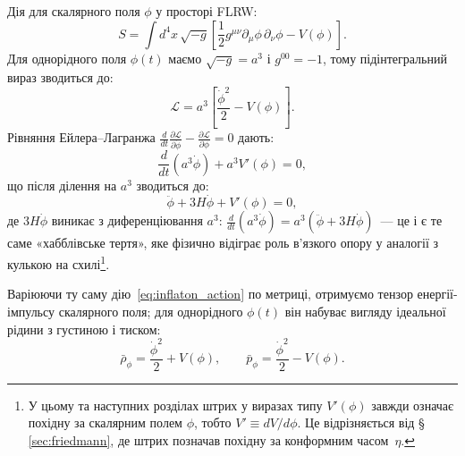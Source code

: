 \documentclass[12pt, a4paper]{article}
\begin{document}
Дія для скалярного поля $\phi$ у просторі FLRW:
\begin{equation}\label{eq:inflaton_action}
  S = \int d^4x\,\sqrt{-g}\left[\frac{1}{2}g^{\mu\nu}\partial_\mu\phi\,\partial_\nu\phi - V(\phi)\right].
\end{equation}
Для однорідного поля $\phi(t)$ маємо $\sqrt{-g} = a^3$ і $g^{00} = -1$,
тому підінтегральний вираз зводиться до:
\begin{equation*}
  \mathcal{L} = a^3\!\left[\frac{\dot{\phi}^2}{2} - V(\phi)\right].
\end{equation*}
Рівняння Ейлера--Лагранжа $\frac{d}{dt}\frac{\partial\mathcal{L}}{\partial\dot{\phi}} - \frac{\partial\mathcal{L}}{\partial\phi} = 0$ дають:
\begin{equation*}
  \frac{d}{dt}\!\left(a^3\dot{\phi}\right) + a^3 V'(\phi) = 0,
\end{equation*}
що після ділення на $a^3$ зводиться до:
\begin{equation}\label{eq:klein_gordon}
    \ddot{\phi} +3H\dot{\phi} + V'(\phi) = 0,
\end{equation}
де $3H\dot{\phi}$ виникає з диференціювання $a^3$:
$\frac{d}{dt}(a^3\dot{\phi}) = a^3(\ddot{\phi} + 3H\dot{\phi})$~---
це і є те саме «хабблівське тертя», яке фізично відіграє роль
в'язкого опору у аналогії з кулькою на схилі\footnote{У цьому та наступних розділах
штрих у виразах типу $V'(\phi)$ завжди означає похідну за
скалярним полем $\phi$, тобто $V' \equiv dV/d\phi$. Це відрізняється
від §\,\ref{sec:friedmann}, де штрих позначав похідну за конформним
часом~$\eta$.}.

Варіюючи ту саму дію~\eqref{eq:inflaton_action} по метриці,
отримуємо тензор енергії-імпульсу скалярного поля; для
однорідного $\phi(t)$ він набуває вигляду ідеальної рідини
з густиною і тиском:
\begin{equation}\label{eq:inflaton_rho_p}
  \bar{\rho}_\phi = \frac{\dot{\phi}^2}{2} + V(\phi),
  \qquad
  \bar{p}_\phi   = \frac{\dot{\phi}^2}{2} - V(\phi).
\end{equation}
\end{document}
